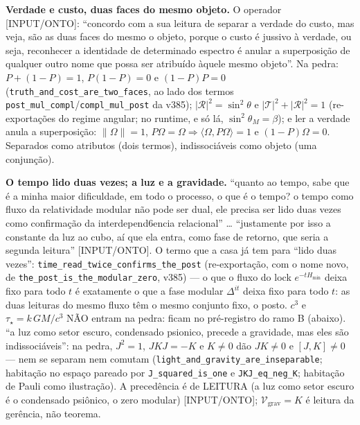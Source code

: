 \documentclass[11pt]{article}
\theoremstyle{definition}\newtheorem{deriv}{Derivação}
\begin{document}
\textbf{Verdade e custo, duas faces do mesmo objeto.} O operador \textsf{[INPUT/ONTO]}: ``concordo com a sua leitura de separar a verdade do custo, mas veja, são as duas faces do mesmo o objeto, porque o custo é jussivo à verdade, ou seja, reconhecer a identidade de determinado espectro é anular a superposição de qualquer outro nome que possa ser atribuído àquele mesmo objeto''. Na pedra: $P+(1-P)=1$, $P(1-P)=0$ e $(1-P)P=0$ (\texttt{truth\_and\_cost\_are\_two\_faces}, ao lado dos termos \texttt{post\_mul\_compl}/\texttt{compl\_mul\_post} da v385); $|\mathcal R|^2=\sin^2\theta$ e $|\mathcal T|^2+|\mathcal R|^2=1$ (re-exportações do regime angular; no runtime, e só lá, $\sin^2\theta_M=\beta$); e ler a verdade anula a superposição: $\|\Omega\|=1$, $P\Omega=\Omega\Rightarrow\langle\Omega,P\Omega\rangle=1$ e $(1-P)\Omega=0$. Separados como atributos (dois termos), indissociáveis como objeto (uma conjunção).

\textbf{O tempo lido duas vezes; a luz e a gravidade.} ``quanto ao tempo, sabe que é a minha maior dificuldade,  em todo o processo, o que é o tempo? o tempo como fluxo da relatividade modular não pode ser dual, ele precisa ser lido duas vezes como confirmação da interdepend6encia relacional'' … ``justamente por isso a constante da luz ao cubo, aí que ela entra, como fase de retorno, que seria a segunda leitura'' \textsf{[INPUT/ONTO]}. O termo que a casa já tem para ``lido duas vezes'': \texttt{time\_read\_twice\_confirms\_the\_post} (re-exportação, com o nome novo, de \texttt{the\_post\_is\_the\_modular\_zero}, v385) --- o que o fluxo do lock $e^{-tH_{\min}}$ deixa fixo para todo $t$ é exatamente o que a fase modular $\Delta^{it}$ deixa fixo para todo $t$: as duas leituras do mesmo fluxo têm o mesmo conjunto fixo, o posto. $c^3$ e $\tau_\star=k\,GM/c^3$ NÃO entram na pedra: ficam no pré-registro do ramo B (abaixo). ``a luz como setor escuro, condensado psionico, precede a gravidade, mas eles são indissociáveis'': na pedra, $J^2=1$, $JKJ=-K$ e $K\neq0$ dão $JK\neq0$ e $[J,K]\neq0$ --- nem se separam nem comutam (\texttt{light\_and\_gravity\_are\_inseparable}; habitação no espaço pareado por \texttt{J\_squared\_is\_one} e \texttt{JKJ\_eq\_neg\_K}; habitação de Pauli como ilustração). A precedência é de LEITURA (a luz como setor escuro é o condensado psiônico, o zero modular) \textsf{[INPUT/ONTO]}; $\mathcal V_{\mathrm{grav}}=K$ é leitura da gerência, não teorema.
\end{document}
